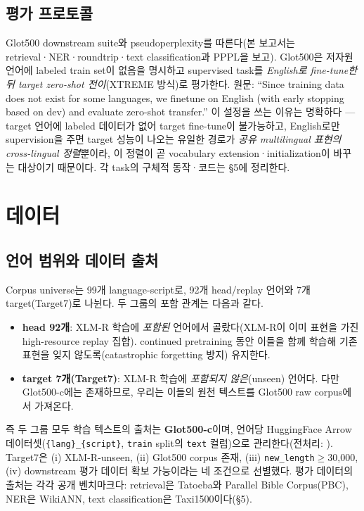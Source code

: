 \documentclass[11pt,a4paper]{article}
\begin{document}
\subsection{평가 프로토콜}
Glot500 downstream suite와 pseudoperplexity를 따른다(본 보고서는 retrieval·NER·roundtrip·text classification과 PPPL을 보고). Glot500은 저자원 언어에 labeled train set이 없음을 명시하고 supervised task를 \emph{English로 fine-tune한 뒤 target zero-shot 전이}(XTREME 방식)로 평가한다. 원문: ``Since training data does not exist for some languages, we finetune on English (with early stopping based on dev) and evaluate zero-shot transfer.'' 이 설정을 쓰는 이유는 명확하다 --- target 언어에 labeled 데이터가 없어 target fine-tune이 불가능하고, English로만 supervision을 주면 target 성능이 나오는 유일한 경로가 \emph{공유 multilingual 표현의 cross-lingual 정렬}뿐이라, 이 정렬이 곧 vocabulary extension·initialization이 바꾸는 대상이기 때문이다. 각 task의 구체적 동작·코드는 \S5에 정리한다.

\section{데이터}

\subsection{언어 범위와 데이터 출처}
Corpus universe는 99개 language-script로, 92개 head/replay 언어와 7개 target(Target7)로 나뉜다. 두 그룹의 포함 관계는 다음과 같다.
\begin{itemize}\setlength\itemsep{0.1em}
\item \textbf{head 92개}: XLM-R 학습에 \emph{포함된} 언어에서 골랐다(XLM-R이 이미 표현을 가진 high-resource replay 집합). continued pretraining 동안 이들을 함께 학습해 기존 표현을 잊지 않도록(catastrophic forgetting 방지) 유지한다.
\item \textbf{target 7개(Target7)}: XLM-R 학습에 \emph{포함되지 않은}(unseen) 언어다. 다만 Glot500-c에는 존재하므로, 우리는 이들의 원천 텍스트를 Glot500 raw corpus에서 가져온다.
\end{itemize}
즉 두 그룹 모두 학습 텍스트의 출처는 \textbf{Glot500-c}이며, 언어당 HuggingFace Arrow 데이터셋(\texttt{\{lang\}\_\{script\}}, \texttt{train} split의 \texttt{text} 컬럼)으로 관리한다(전처리: ). Target7은 (i) XLM-R-unseen, (ii) Glot500 corpus 존재, (iii) \texttt{new\_length}$\ge$30{,}000, (iv) downstream 평가 데이터 확보 가능이라는 네 조건으로 선별했다. 평가 데이터의 출처는 각각 공개 벤치마크다: retrieval은 Tatoeba와 Parallel Bible Corpus(PBC), NER은 WikiANN, text classification은 Taxi1500이다(\S5).
\end{document}
